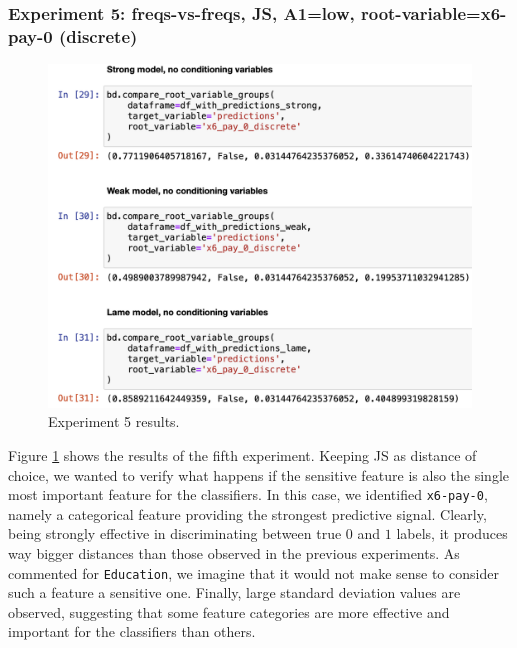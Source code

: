 \documentclass[
]{ceurart}
\begin{document}
\subsubsection{Experiment 5: freqs-vs-freqs, JS, A1=low, root-variable=x6-pay-0 (discrete)}

\begin{figure}[h!]
  \includegraphics[width=.8\linewidth, left]{exp5.png}
  \caption{Experiment 5 results.}
  \label{fig:exp5}
\end{figure}
Figure \ref{fig:exp5} shows the results of the fifth experiment. Keeping JS as distance of choice, we wanted to verify what happens if the sensitive feature is also the single most important feature for the classifiers. In this case, we identified \texttt{x6-pay-0}, namely a categorical feature providing the strongest predictive signal. Clearly, being strongly effective in discriminating between true $0$ and $1$ labels, it produces way bigger distances than those observed in the previous experiments. As commented for \texttt{Education}, we imagine that it would not make sense to consider such a feature a sensitive one. Finally, large standard deviation values are observed, suggesting that some feature categories are more effective and important for the classifiers than others. 
\end{document}
